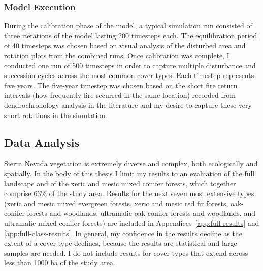 


\subsubsection{Model Execution}
During the calibration phase of the model, a typical simulation run consisted of three iterations of the model lasting 200 timesteps each. The equilibration period of 40 timesteps was chosen based on visual analysis of the disturbed area and rotation plots from the combined runs. Once calibration was complete, I conducted one run of 500 timesteps in order to capture multiple disturbance and succession cycles across the most common cover types. Each timestep represents five years. The five-year timestep was chosen based on the short fire return intervals (how frequently fire recurred in the same location) recorded from dendrochronology analysis in the literature and my desire to capture these very short rotations in the simulation.

\subsection{Data Analysis}
\label{subsec:dataanalysis}

Sierra Nevada vegetation is extremely diverse and complex, both ecologically and spatially. In the body of this thesis I limit my results to an evaluation of the full landscape and of the xeric and mesic mixed conifer forests, which together comprise 63\% of the study area. Results for the next seven most extensive types (xeric and mesic mixed evergreen forests, xeric and mesic red fir forests, oak-conifer forests and woodlands, ultramafic oak-conifer forests and woodlands, and ultramafic mixed conifer forests) are included in Appendices~\ref{app:full-results} and \ref{app:full-class-results}. In general, my confidence in the results decline as the extent of a cover type declines, because the results are statistical and large samples are needed. I do not include results for cover types that extend across less than 1000 ha of the study area.

